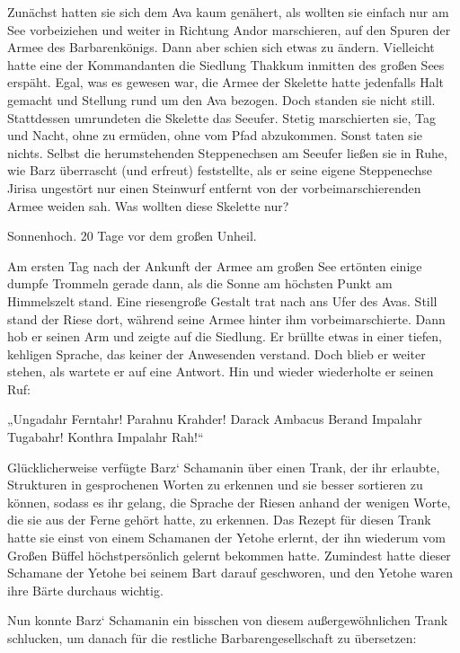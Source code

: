 Zunächst hatten sie sich dem Ava kaum genähert, als wollten sie einfach nur am See vorbeiziehen und weiter in Richtung Andor marschieren, auf den Spuren der Armee des Barbarenkönigs. Dann aber schien sich etwas zu ändern. Vielleicht hatte eine der Kommandanten die Siedlung Thakkum inmitten des großen Sees erspäht. Egal, was es gewesen war, die Armee der Skelette hatte jedenfalls Halt gemacht und Stellung rund um den Ava bezogen. Doch standen sie nicht still. Stattdessen umrundeten die Skelette das Seeufer. Stetig marschierten sie, Tag und Nacht, ohne zu ermüden, ohne vom Pfad abzukommen. Sonst taten sie nichts. Selbst die herumstehenden Steppenechsen am Seeufer ließen sie in Ruhe, wie Barz überrascht (und erfreut) feststellte, als er seine eigene Steppenechse Jirisa ungestört nur einen Steinwurf entfernt von der vorbeimarschierenden Armee weiden sah. Was wollten diese Skelette nur?\bigskip







Sonnenhoch. 20 Tage vor dem großen Unheil.\bigskip



Am ersten Tag nach der Ankunft der Armee am großen See ertönten einige dumpfe Trommeln gerade dann, als die Sonne am höchsten Punkt am Himmelszelt stand. Eine riesengroße Gestalt trat nach ans Ufer des Avas. Still stand der Riese dort, während seine Armee hinter ihm vorbeimarschierte. Dann hob er seinen Arm und zeigte auf die Siedlung. Er brüllte etwas in einer tiefen, kehligen Sprache, das keiner der Anwesenden verstand. Doch blieb er weiter stehen, als wartete er auf eine Antwort. Hin und wieder wiederholte er seinen Ruf:

„Ungadahr Ferntahr! Parahnu Krahder! Darack Ambacus Berand Impalahr Tugabahr! Konthra Impalahr Rah!“

Glücklicherweise verfügte Barz‘ Schamanin über einen Trank, der ihr erlaubte, Strukturen in gesprochenen Worten zu erkennen und sie besser sortieren zu können, sodass es ihr gelang, die Sprache der Riesen anhand der wenigen Worte, die sie aus der Ferne gehört hatte, zu erkennen. Das Rezept für diesen Trank hatte sie einst von einem Schamanen der Yetohe erlernt, der ihn wiederum vom Großen Büffel höchstpersönlich gelernt bekommen hatte. Zumindest hatte dieser Schamane der Yetohe bei seinem Bart darauf geschworen, und den Yetohe waren ihre Bärte durchaus wichtig.

Nun konnte Barz‘ Schamanin ein bisschen von diesem außergewöhnlichen Trank schlucken, um danach für die restliche Barbarengesellschaft zu übersetzen:

